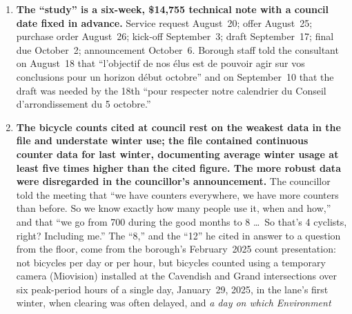 \documentclass[10pt,letterpaper]{article}
\begin{document}
\begin{enumerate}[nosep,itemsep=0.3em,leftmargin=1.4em]
\begin{minipage}[t]{\linewidth}
    respecte les normes minimales pr\'evues par la loi,'' and ``le retour du
    stationnement d'un c\^ot\'e de la rue.'' No winter measure appears. The
    service request a week later added Volet~1, removal of cycling
    facilities in winter, as ``mesure transitoire pour l'hiver
    2026--2027,'' ahead of Volet~2, the permanent bidirectional lane. The
    winter conversion announced on October~6 is the first step of a
    year-round reduction of cycling space that has not been disclosed to
    the public.\end{minipage}\vspace{0.35em}
\item \begin{minipage}[t]{\linewidth}\textbf{The ``study'' is a six-week, \$14{,}755 technical note with a
    council date fixed in advance.} Service request August~20; offer
    August~25; purchase order August~26; kick-off September~3; draft
    September~17; final due October~2; announcement October~6. Borough staff
    told the consultant on August~18 that ``l'objectif de nos \'elus est de
    pouvoir agir sur vos conclusions pour un horizon d\'ebut octobre'' and on
    September~10 that the draft was needed by the 18th ``pour respecter notre
    calendrier du Conseil d'arrondissement du 5 octobre.''\end{minipage}\vspace{0.35em}
\item \begin{minipage}[t]{\linewidth}\textbf{The bicycle counts cited at council rest on the weakest
    data in the file and understate winter use; the file contained
    continuous counter data for last winter, documenting average winter usage
    at least five times higher than the cited figure. The more robust data
    were disregarded in the councillor's announcement.} The councillor told
    the meeting that ``we have counters everywhere, we have more counters
    than before. So we know exactly how many people use it, when and how,''
    and that ``we go from 700 during the good months to 8 \ldots\ So that's 4
    cyclists, right? Including me.'' The ``8,'' and the ``12'' he cited in
    answer to a question from the floor, come from the borough's February~2025
    count presentation: not bicycles per day or per hour, but bicycles
    counted using a temporary camera (Miovision) installed at the Cavendish
    and Grand intersections over six
    peak-period hours of a single day, January~29, 2025, in the lane's first
    winter, when clearing was often delayed, and \emph{a day on which Environment
}
\end{minipage}
\end{enumerate}
\end{document}
